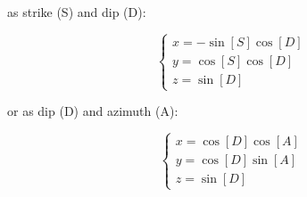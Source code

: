 \noindent as strike (S) and dip (D):

\begin{equation}
  \left\{
  \begin{array}{l}
    x = -\sin[S] \cos[D]\\
    y = \cos[S] \cos[D]\\
    z = \sin[D]
  \end{array}
  \right.
\end{equation}

\noindent or as dip (D) and azimuth (A):

\begin{equation}
  \left\{
  \begin{array}{l}
    x = \cos[D] \cos[A]\\
    y = \cos[D] \sin[A]\\
    z = \sin[D]
  \end{array}
  \right.
\end{equation}
